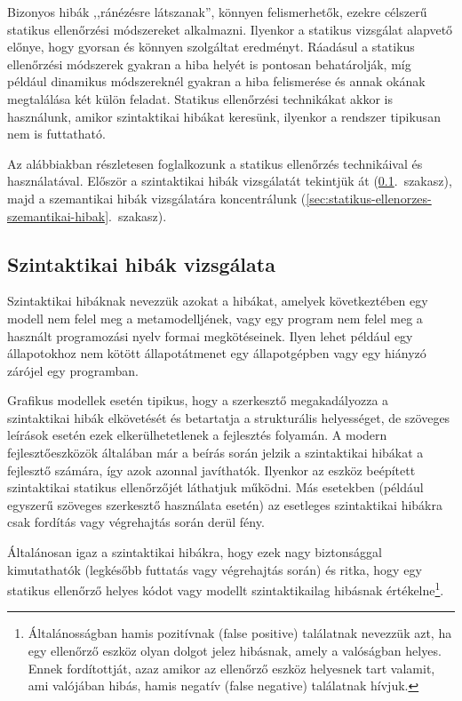 Bizonyos hibák ,,ránézésre látszanak'', könnyen felismerhetők, ezekre célszerű statikus ellenőrzési módszereket alkalmazni. Ilyenkor a statikus vizsgálat alapvető előnye, hogy gyorsan és könnyen szolgáltat eredményt. Ráadásul a statikus ellenőrzési módszerek gyakran a hiba helyét is pontosan behatárolják, míg például dinamikus módszereknél gyakran a hiba felismerése és annak okának megtalálása két külön feladat. Statikus ellenőrzési technikákat akkor is használunk, amikor szintaktikai hibákat keresünk, ilyenkor a rendszer tipikusan nem is futtatható.

Az alábbiakban részletesen foglalkozunk a statikus ellenőrzés technikáival és használatával. Először a szintaktikai hibák vizsgálatát tekintjük át (\ref{sec:statikus-ellenorzes-szintaktikai-hibak}.~szakasz), majd a szemantikai hibák vizsgálatára koncentrálunk (\ref{sec:statikus-ellenorzes-szemantikai-hibak}.~szakasz).

\subsection{Szintaktikai hibák vizsgálata}\label{sec:statikus-ellenorzes-szintaktikai-hibak}

Szintaktikai hibáknak nevezzük azokat a hibákat, amelyek következtében egy modell nem felel meg a metamodelljének, vagy egy program nem felel meg a használt programozási nyelv formai megkötéseinek. Ilyen lehet például egy állapotokhoz nem kötött állapotátmenet egy állapotgépben vagy egy hiányzó zárójel egy programban.

Grafikus modellek esetén tipikus, hogy a szerkesztő megakadályozza a szintaktikai hibák elkövetését és betartatja a strukturális helyességet, de szöveges leírások esetén ezek elkerülhetetlenek a fejlesztés folyamán. A modern fejlesztőeszközök általában már a beírás során jelzik a szintaktikai hibákat a fejlesztő számára, így azok azonnal javíthatók. Ilyenkor az eszköz beépített szintaktikai statikus ellenőrzőjét láthatjuk működni. Más esetekben (például egyszerű szöveges szerkesztő használata esetén) az esetleges szintaktikai hibákra csak fordítás vagy végrehajtás során derül fény.

Általánosan igaz a szintaktikai hibákra, hogy ezek nagy biztonsággal kimutathatók (legkésőbb futtatás vagy végrehajtás során) és ritka, hogy egy statikus ellenőrző helyes kódot vagy modellt szintaktikailag hibásnak értékelne\footnote{Általánosságban hamis pozitívnak (false positive) találatnak nevezzük azt, ha egy ellenőrző eszköz olyan dolgot jelez hibásnak, amely a valóságban helyes. Ennek fordítottját, azaz amikor az ellenőrző eszköz helyesnek tart valamit, ami valójában hibás, hamis negatív (false negative) találatnak hívjuk.\kiegeszitoanyag}.

